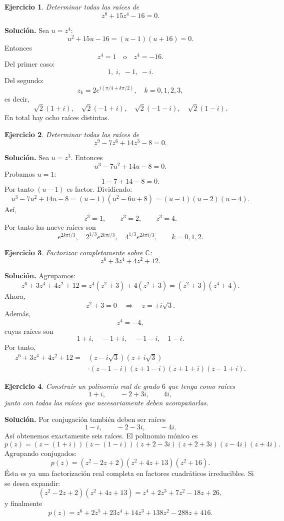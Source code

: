 \documentclass[12pt]{article}
\newtheorem{ejercicio}{Ejercicio}[section]
\newcommand{\C}{\mathbb{C}}
\begin{document}
\begin{ejercicio}
Determinar todas las raíces de
\[
z^8+15z^4-16=0.
\]
\end{ejercicio}

\textbf{Solución.}
Sea $u=z^4$:
\[
u^2+15u-16=(u-1)(u+16)=0.
\]
Entonces
\[
z^4=1
\quad\text{o}\quad
z^4=-16.
\]
Del primer caso:
\[
1,\;i,\;-1,\;-i.
\]
Del segundo:
\[
z_k=2e^{i(\pi/4+k\pi/2)},\quad k=0,1,2,3,
\]
es decir,
\[
\sqrt2(1+i),\quad
\sqrt2(-1+i),\quad
\sqrt2(-1-i),\quad
\sqrt2(1-i).
\]
En total hay ocho raíces distintas.

\begin{ejercicio}
Determinar todas las raíces de
\[
z^9-7z^6+14z^3-8=0.
\]
\end{ejercicio}

\textbf{Solución.}
Sea $u=z^3$. Entonces
\[
u^3-7u^2+14u-8=0.
\]
Probamos $u=1$:
\[
1-7+14-8=0.
\]
Por tanto $(u-1)$ es factor. Dividiendo:
\[
u^3-7u^2+14u-8=(u-1)(u^2-6u+8)
=(u-1)(u-2)(u-4).
\]
Así,
\[
z^3=1,\qquad z^3=2,\qquad z^3=4.
\]
Por tanto las nueve raíces son
\[
\boxed{
e^{2k\pi i/3},\quad
2^{1/3}e^{2k\pi i/3},\quad
4^{1/3}e^{2k\pi i/3},
\qquad k=0,1,2.
}
\]

\begin{ejercicio}
Factorizar completamente sobre $\C$:
\[
z^6+3z^4+4z^2+12.
\]
\end{ejercicio}

\textbf{Solución.}
Agrupamos:
\[
z^6+3z^4+4z^2+12
=z^4(z^2+3)+4(z^2+3)
=(z^2+3)(z^4+4).
\]
Ahora,
\[
z^2+3=0
\quad\Longrightarrow\quad
z=\pm i\sqrt3.
\]
Además,
\[
z^4=-4,
\]
cuyas raíces son
\[
1+i,\quad -1+i,\quad -1-i,\quad 1-i.
\]
Por tanto,
\[
\boxed{
\begin{aligned}
z^6+3z^4+4z^2+12
={}&(z-i\sqrt3)(z+i\sqrt3)\\
&\cdot(z-1-i)(z+1-i)(z+1+i)(z-1+i).
\end{aligned}}
\]

\begin{ejercicio}
Construir un polinomio real de grado $6$ que tenga como raíces
\[
1+i,\qquad -2+3i,\qquad4i,
\]
junto con todas las raíces que necesariamente deben acompañarlas.
\end{ejercicio}

\textbf{Solución.}
Por conjugación también deben ser raíces
\[
1-i,\qquad -2-3i,\qquad -4i.
\]
Así obtenemos exactamente seis raíces. El polinomio mónico es
\[
p(z)=
(z-(1+i))(z-(1-i))
(z+2-3i)(z+2+3i)
(z-4i)(z+4i).
\]
Agrupando conjugados:
\[
p(z)=(z^2-2z+2)(z^2+4z+13)(z^2+16).
\]
Ésta es ya una factorización real completa en factores cuadráticos
irreducibles. Si se desea expandir:
\[
(z^2-2z+2)(z^2+4z+13)
=z^4+2z^3+7z^2-18z+26,
\]
y finalmente
\[
\boxed{
p(z)=z^6+2z^5+23z^4+14z^3+138z^2-288z+416.
}
\]
\end{document}
